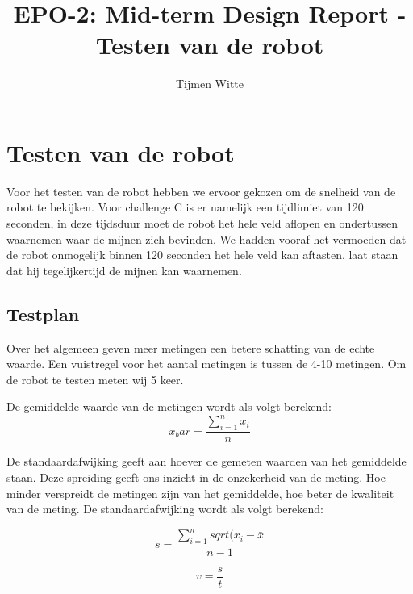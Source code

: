 \documentclass{report}
\title{EPO-2: Mid-term Design Report - Testen van de robot}
\author{Tijmen Witte}
\begin{document}
\chapter{Testen van de robot}

Voor het testen van de robot hebben we ervoor gekozen om de snelheid van de robot te bekijken.
Voor challenge C is er namelijk een tijdlimiet van 120 seconden, in deze tijdsduur moet de robot het hele veld aflopen en ondertussen waarnemen waar de mijnen zich bevinden.
We hadden vooraf het vermoeden dat de robot onmogelijk binnen 120 seconden het hele veld kan aftasten, laat staan dat hij tegelijkertijd de mijnen kan waarnemen. 

\section{Testplan}
Over het algemeen geven meer metingen een betere schatting van de echte waarde. Een vuistregel voor het aantal metingen is tussen de 4-10 metingen. Om de robot te testen meten wij 5 keer. 

De gemiddelde waarde van de metingen wordt als volgt berekend:
\begin{equation}
x_bar=\frac{\sum_{i=1}^{n}x_i}{n}
\end{equation}

De standaardafwijking geeft aan hoever de gemeten waarden van het gemiddelde staan. Deze spreiding geeft ons inzicht in de onzekerheid van de meting. Hoe minder verspreidt de metingen zijn van het gemiddelde, hoe beter de kwaliteit van de meting. De standaardafwijking wordt als volgt berekend:

\begin{equation}
s=\frac{\sum_{i=1}^{n}sqrt{(x_i-\bar{x}}}{n-1}
\end{equation}

\begin{equation}
v=\frac{s}{t}
\end{equation}
\end{document}
